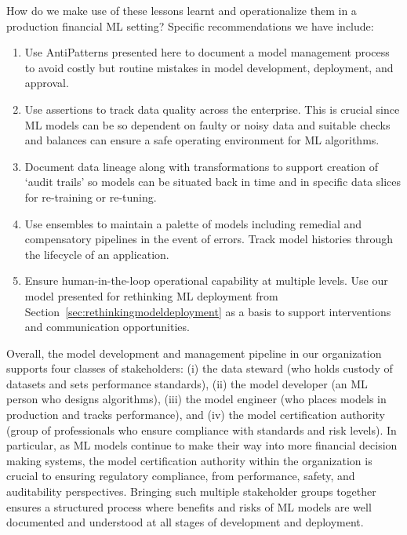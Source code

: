 How do we make use of these lessons learnt and operationalize them in a production financial ML setting?
Specific recommendations we have include:
\begin{enumerate}
    \item Use AntiPatterns presented here to document a model management process to avoid costly but routine mistakes in model development, deployment, and approval.
    \item Use assertions to track data quality across the enterprise. This is crucial since ML models can be so dependent on faulty or noisy data and suitable checks and balances can ensure a safe operating environment for ML algorithms.
    \item Document data lineage along with transformations to support creation of `audit trails' so models can be situated back in time and in specific data slices for re-training or re-tuning.
    \item Use ensembles to maintain a palette of models including remedial and compensatory pipelines in the event of errors. Track model histories through the lifecycle of an application.
    \item Ensure human-in-the-loop operational capability at multiple levels. Use our model presented for rethinking ML deployment from Section~\ref{sec:rethinkingmodeldeployment} as a basis to support interventions and communication opportunities.
\end{enumerate}

Overall, the model development and management pipeline in our organization supports four classes of stakeholders: (i) the data steward (who holds custody of datasets and sets performance standards), (ii) the model developer (an ML person who designs algorithms), (iii) the model engineer (who places models in production and tracks performance), and (iv) the model certification authority (group of professionals who ensure compliance with standards and risk levels).
In particular, as ML models continue to make their way into more financial decision making systems, the model certification authority within the organization is crucial to ensuring regulatory compliance, from performance, safety, and auditability perspectives.
Bringing such multiple stakeholder groups together ensures a structured process where benefits and risks of ML models are well documented and understood at all stages of development and deployment.

